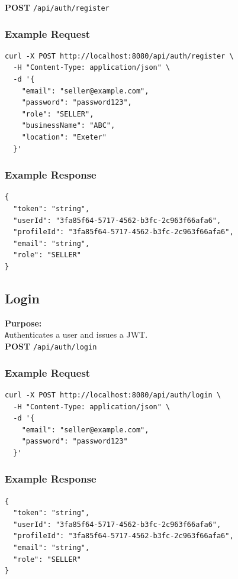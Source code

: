 \documentclass[a4paper,11pt]{article}
\begin{document}
\textbf{POST} \texttt{/api/auth/register} \\

\subsubsection*{Example Request}
\begin{lstlisting}
curl -X POST http://localhost:8080/api/auth/register \
  -H "Content-Type: application/json" \
  -d '{
    "email": "seller@example.com",
    "password": "password123",
    "role": "SELLER",
    "businessName": "ABC",
    "location": "Exeter"
  }'
\end{lstlisting}

\subsubsection*{Example Response}
\begin{lstlisting}
{
  "token": "string",
  "userId": "3fa85f64-5717-4562-b3fc-2c963f66afa6",
  "profileId": "3fa85f64-5717-4562-b3fc-2c963f66afa6",
  "email": "string",
  "role": "SELLER"
}
\end{lstlisting}

\subsection {Login}
\textbf{Purpose:} \\ \texttt Authenticates a user and issues a JWT. \\

\textbf{POST} \texttt{/api/auth/login}

\subsubsection*{Example Request}
\begin{lstlisting}
curl -X POST http://localhost:8080/api/auth/login \
  -H "Content-Type: application/json" \
  -d '{
    "email": "seller@example.com",
    "password": "password123"
  }'
\end{lstlisting}

\subsubsection*{Example Response}
\begin{lstlisting}
{
  "token": "string",
  "userId": "3fa85f64-5717-4562-b3fc-2c963f66afa6",
  "profileId": "3fa85f64-5717-4562-b3fc-2c963f66afa6",
  "email": "string",
  "role": "SELLER"
}
\end{lstlisting}
\end{document}
